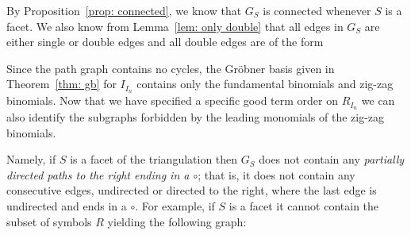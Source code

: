 By Proposition~\ref{prop: connected}, we know that $G_S$ is connected whenever $S$ is a facet.  
We also know from Lemma~\ref{lem: only double} that all edges in $G_S$ are either single or double edges and all double edges are of the form
\begin{center}
    \end{center}
Since the path graph contains no cycles, the Gr\"obner basis given in Theorem~\ref{thm: gb} for $I_{I_{n}}$ contains only the fundamental binomials and zig-zag binomials. 
Now that we have specified a specific good term order on $R_{I_{n}}$ we can also identify the subgraphs forbidden by the leading monomials of the zig-zag binomials.

Namely, if $S$ is a facet of the triangulation then $G_S$ does not contain any \emph{partially directed paths to the right ending in a $\circ$}; that is, it does not contain any consecutive edges, undirected or directed to the right, where the last edge is undirected and ends in a $\circ$.  
For example, if $S$ is a facet it cannot contain the subset of symbols $R$ yielding the following graph:

